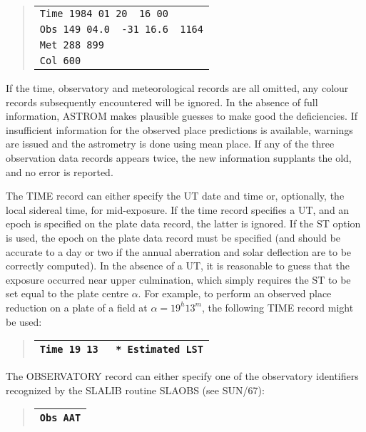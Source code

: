 \documentclass[twoside,11pt]{article}
\newcommand{\xref}[3]{#1}
\renewcommand{\_}{\texttt{\symbol{95}}}
\begin{document}
\begin{quote}
\begin{tabular}{|l|}
\hline
\verb|Time 1984 01 20  16 00| \\
\verb|Obs 149 04.0  -31 16.6  1164| \\
\verb|Met 288 899| \\
\verb|Col 600| \\
\hline
\end{tabular}
\end{quote}

If the time, observatory and meteorological records are all omitted,
any colour records subsequently encountered will be ignored.  In the
absence of full information, ASTROM makes plausible guesses to make good
the deficiencies.  If insufficient information for the observed place
predictions is available, warnings are issued and the astrometry is done
using mean place.  If any of the three observation data records appears
twice, the new information supplants the old, and no error is reported.

The TIME record can either specify the UT date and time or, optionally,
the local sidereal time, for mid-exposure.  If the time record specifies
a UT, and an epoch is specified on the plate data record, the latter is
ignored.  If the ST option is used, the epoch on the plate data record
must be specified (and should be accurate to a day or two if the annual
aberration and solar deflection are to be correctly computed).  In the
absence of a UT, it is reasonable to guess that the exposure occurred
near upper culmination, which simply requires the ST to be set equal to
the plate centre $\alpha$.  For example, to perform an observed place
reduction on a plate of a field at $\alpha=19^{h}13^{m}$, the following
TIME record might be used:

\begin{quote}
\begin{tabular}{|l|}
\hline
\verb|Time 19 13   * Estimated LST| \\
\hline
\end{tabular}
\end{quote}

The OBSERVATORY record can either specify one of the observatory
identifiers recognized by the \xref{SLALIB}{sun67}{} routine
\xref{SLA\_OBS}{sun67}{SLA_OBS} (see SUN/67):

\begin{quote}
\begin{tabular}{|l|}
\hline
\verb|Obs AAT| \\
\hline
\end{tabular}
\end{quote}
\end{document}
